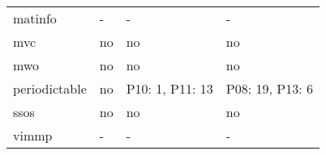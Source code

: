\begin{tabular}{m{5cm}m{3cm}m{3cm}m{3cm}}
                matinfo &              - &               - &                                        - \\
                    mvc &             no &              no &                                       no \\
                    mwo &             no &              no &                                       no \\
          periodictable &             no & P10: 1, P11: 13 &                          P08: 19, P13: 6 \\
                   ssos &             no &              no &                                       no \\
                  vimmp &              - &               - &                                        - \\
\bottomrule
\end{tabular}
